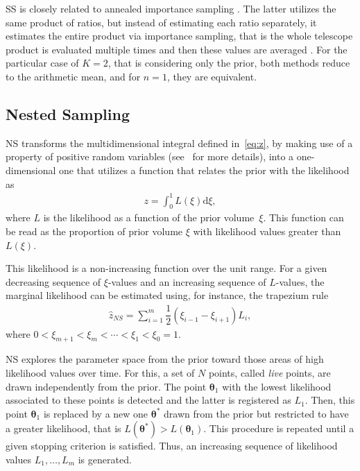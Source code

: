 \documentclass[aps,reprint,amsmath,amssymb,showpacs,showkeys]{revtex4-1}%
\begin{document}
SS is closely related to annealed importance sampling \citep[][]{Neal:2001}.  The latter utilizes the same product of ratios, but instead of estimating each ratio separately, it estimates the entire product via importance sampling, that is the whole telescope product is evaluated multiple times and then these values are averaged \citep{Maturana:2017}.  For the particular case of $K = 2$, that is considering only the prior, both methods reduce to the arithmetic mean, and for $n =1$, they are equivalent.   


\subsection{Nested Sampling}

NS transforms the multidimensional integral defined in~\eqref{eq:z}, by making use of a property of positive random variables (see~\cite{Maturana:2017b} for more details), into a one-dimensional one that utilizes a function that relates the prior with the likelihood as 
\begin{align*}
z = \int_{0}^{1} L(\xi)\text{d}\xi, 
\end{align*}
where $L$ is the likelihood as a function of the prior volume~$\xi$.  This function can be read as the proportion of prior volume $\xi$ with likelihood values greater than $L(\xi)$. 

This likelihood is a non-increasing function over the unit range.  For a given decreasing sequence of $\xi$-values and an increasing sequence of $L$-values, the marginal likelihood can be estimated using, for instance, the trapezium rule
\begin{align*}
\widehat{z}_{NS} = \sum_{i=1}^{m} \dfrac{1}{2}(\xi_{i-1} - \xi_{i+1})L_i,
\end{align*}
where $0 < \xi_{m+1} < \xi_{m} < \cdots < \xi_1<\xi_0 = 1$.

NS explores the parameter space from the prior toward those areas of high likelihood values over time.  For this, a set of $N$ points, called \textit{live} points, are drawn independently from the prior.  The point $\bm{\theta}_1$ with the lowest likelihood associated to these points is detected and the latter is registered as $L_1$.  Then, this point $\bm{\theta}_1$ is replaced by a new one $\bm{\theta}^*$ drawn from the prior but restricted to have a greater likelihood, that is $L(\bm{\theta}^*) > L(\bm{\theta}_1)$.  This procedure is repeated until a given stopping criterion is satisfied.  Thus, an increasing sequence of likelihood values $L_1, \dots, L_m$ is generated.
\end{document}
